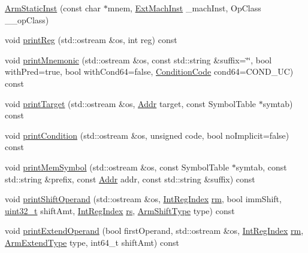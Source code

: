 \begin{DoxyCompactItemize}
\item 
\hyperlink{classArmISA_1_1ArmStaticInst_a996483aaded98afb7f4306959a94f118}{ArmStaticInst} (const char $\ast$mnem, \hyperlink{classStaticInst_a5605d4fc727eae9e595325c90c0ec108}{ExtMachInst} \_\-machInst, OpClass \_\-\_\-opClass)
\item 
void \hyperlink{classArmISA_1_1ArmStaticInst_a48f52fc281b71e29aa8733caf36546fa}{printReg} (std::ostream \&os, int reg) const 
\item 
void \hyperlink{classArmISA_1_1ArmStaticInst_a88eea7239477478ffadf11474ea8454f}{printMnemonic} (std::ostream \&os, const std::string \&suffix=\char`\"{}\char`\"{}, bool withPred=true, bool withCond64=false, \hyperlink{namespaceArmISA_ab8f08e777c4753720cff841f81da8e06}{ConditionCode} cond64=COND\_\-UC) const 
\item 
void \hyperlink{classArmISA_1_1ArmStaticInst_ae7bcb973c05eaba610f0c9bcd5a613d7}{printTarget} (std::ostream \&os, \hyperlink{classm5_1_1params_1_1Addr}{Addr} target, const SymbolTable $\ast$symtab) const 
\item 
void \hyperlink{classArmISA_1_1ArmStaticInst_a5406949b89d21af62d6d0208837130f4}{printCondition} (std::ostream \&os, unsigned code, bool noImplicit=false) const 
\item 
void \hyperlink{classArmISA_1_1ArmStaticInst_a2e070f27c98b230d26db666f40256594}{printMemSymbol} (std::ostream \&os, const SymbolTable $\ast$symtab, const std::string \&prefix, const \hyperlink{classm5_1_1params_1_1Addr}{Addr} addr, const std::string \&suffix) const 
\item 
void \hyperlink{classArmISA_1_1ArmStaticInst_aadac34271bfa06cdbf005536896b4a63}{printShiftOperand} (std::ostream \&os, \hyperlink{namespaceArmISA_ae64680ba9fb526106829d6bf92fc791b}{IntRegIndex} \hyperlink{namespaceArmISA_ad546c2cf2168cf2d8ac21b2a9f485e82}{rm}, bool immShift, \hyperlink{Type_8hh_a435d1572bf3f880d55459d9805097f62}{uint32\_\-t} shiftAmt, \hyperlink{namespaceArmISA_ae64680ba9fb526106829d6bf92fc791b}{IntRegIndex} \hyperlink{namespaceArmISA_acf2b1073855b77fc0cddb61c70ec5391}{rs}, \hyperlink{namespaceArmISA_a209d79feaaef0aa2f54ae62e53ee90de}{ArmShiftType} type) const 
\item 
void \hyperlink{classArmISA_1_1ArmStaticInst_a911f1c2066f7df1b82ea71902f97e6d0}{printExtendOperand} (bool firstOperand, std::ostream \&os, \hyperlink{namespaceArmISA_ae64680ba9fb526106829d6bf92fc791b}{IntRegIndex} \hyperlink{namespaceArmISA_ad546c2cf2168cf2d8ac21b2a9f485e82}{rm}, \hyperlink{namespaceArmISA_a4420842b5673543552a3aba317c69dbb}{ArmExtendType} type, int64\_\-t shiftAmt) const 

\end{DoxyCompactItemize}
